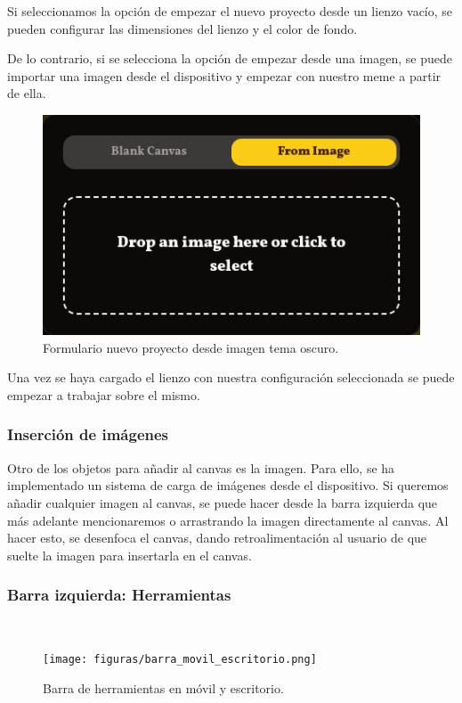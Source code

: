 Si seleccionamos la opción de empezar el nuevo proyecto desde un lienzo vacío, se pueden configurar las dimensiones del lienzo y el color de fondo.

De lo contrario, si se selecciona la opción de empezar desde una imagen, se puede importar una imagen desde el dispositivo y empezar con nuestro meme a partir de ella.

\begin{figure}[H]
    \caption{Formulario nuevo proyecto desde imagen tema oscuro.}
    \centering
    \vspace*{0.5cm}
    \includegraphics[scale=0.5]{figuras/meme_imagen_oscuro.png}
\end{figure}

Una vez se haya cargado el lienzo con nuestra configuración seleccionada se puede empezar a trabajar sobre el mismo.

\subsubsection{Inserción de imágenes}

Otro de los objetos para añadir al canvas es la imagen. Para ello, se ha implementado un sistema de carga de imágenes desde el dispositivo. Si queremos añadir cualquier imagen al canvas, se puede hacer desde la barra izquierda que más adelante mencionaremos o arrastrando la imagen directamente al canvas. Al hacer esto, se desenfoca el canvas, dando retroalimentación al usuario de que suelte la imagen para insertarla en el canvas.

\subsubsection{Barra izquierda: Herramientas}~\label{subsec:barra_izquierda}

\begin{figure}[H]
    \caption{Barra de herramientas en móvil y escritorio.}
    \centering
    \vspace*{0.5cm}
    \texttt{[image: figuras/barra\_movil\_escritorio.png]}
\end{figure}

